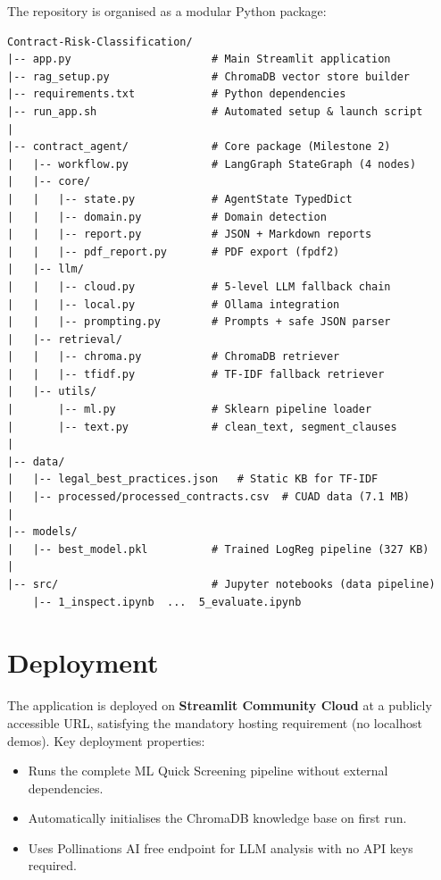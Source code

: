 \documentclass[12pt,a4paper]{article}
\begin{document}
The repository is organised as a modular Python package:

\begin{lstlisting}
Contract-Risk-Classification/
|-- app.py                      # Main Streamlit application
|-- rag_setup.py                # ChromaDB vector store builder
|-- requirements.txt            # Python dependencies
|-- run_app.sh                  # Automated setup & launch script
|
|-- contract_agent/             # Core package (Milestone 2)
|   |-- workflow.py             # LangGraph StateGraph (4 nodes)
|   |-- core/
|   |   |-- state.py            # AgentState TypedDict
|   |   |-- domain.py           # Domain detection
|   |   |-- report.py           # JSON + Markdown reports
|   |   |-- pdf_report.py       # PDF export (fpdf2)
|   |-- llm/
|   |   |-- cloud.py            # 5-level LLM fallback chain
|   |   |-- local.py            # Ollama integration
|   |   |-- prompting.py        # Prompts + safe JSON parser
|   |-- retrieval/
|   |   |-- chroma.py           # ChromaDB retriever
|   |   |-- tfidf.py            # TF-IDF fallback retriever
|   |-- utils/
|       |-- ml.py               # Sklearn pipeline loader
|       |-- text.py             # clean_text, segment_clauses
|
|-- data/
|   |-- legal_best_practices.json   # Static KB for TF-IDF
|   |-- processed/processed_contracts.csv  # CUAD data (7.1 MB)
|
|-- models/
|   |-- best_model.pkl          # Trained LogReg pipeline (327 KB)
|
|-- src/                        # Jupyter notebooks (data pipeline)
    |-- 1_inspect.ipynb  ...  5_evaluate.ipynb
\end{lstlisting}

\section{Deployment}
\label{sec:deployment}

The application is deployed on \textbf{Streamlit Community Cloud} at a publicly
accessible URL, satisfying the mandatory hosting requirement (no localhost demos).
Key deployment properties:

\begin{itemize}[leftmargin=1.5cm]
    \item Runs the complete ML Quick Screening pipeline without external dependencies.
    \item Automatically initialises the ChromaDB knowledge base on first run.
    \item Uses Pollinations AI free endpoint for LLM analysis with no API keys required.
\end{itemize}
\end{document}
